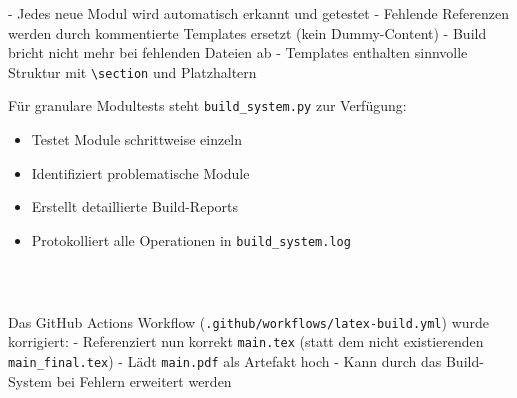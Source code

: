 \textbf{\textcolor{ctmmBlue}{\1}} - Jedes neue Modul wird automatisch erkannt und getestet - Fehlende Referenzen werden durch kommentierte Templates ersetzt (kein Dummy-Content) - Build bricht nicht mehr bei fehlenden Dateien ab - Templates enthalten sinnvolle Struktur mit \texttt{\textbackslash{}section} und Platzhaltern

\textbf{\textcolor{ctmmBlue}{\1}} Für granulare Modultests steht \texttt{build\_system.py} zur Verfügung:

\begin{Shaded}
\begin{Highlighting}\checkbox
{}
\end{Highlighting}
\end{Shaded}

\begin{itemize}[label=\textcolor{ctmmOrange}{\faArrowRight}]
\tightlist
\item
  Testet Module schrittweise einzeln
\item
  Identifiziert problematische Module
\item
  Erstellt detaillierte Build-Reports
\item
  Protokolliert alle Operationen in \texttt{build\_system.log}
\end{itemize}

\hypertarget{github-workflow-integration}{%
\subsubsection{\textcolor{ctmmGreen}{\faList~\1}}\label{github-workflow-integration}}

Das GitHub Actions Workflow (\texttt{.github/workflows/latex-build.yml}) wurde korrigiert: - Referenziert nun korrekt \texttt{main.tex} (statt dem nicht existierenden \texttt{main\_final.tex}) - Lädt \texttt{main.pdf} als Artefakt hoch - Kann durch das Build-System bei Fehlern erweitert werden

\textbf{\textcolor{ctmmBlue}{\1}}

